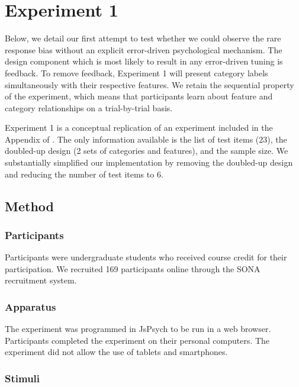 \documentclass[10pt,letterpaper]{article}
\begin{document}
\section{Experiment 1}

Below, we detail our first attempt to test whether we could observe the rare response bias without an explicit error-driven psychological mechanism.
The design component which is most likely to result in any error-driven tuning is feedback.
To remove feedback, Experiment 1 will present category labels simultaneously with their respective features.
We retain the sequential property of the experiment, which means that participants learn about feature and category relationships on a trial-by-trial basis.

Experiment 1 is a conceptual replication of an experiment included in the Appendix of .
The only information available is the list of test items (23), the doubled-up design (2 sets of categories and features), and the sample size.
We substantially simplified our implementation by removing the doubled-up design and reducing the number of test items to 6.

\subsection{Method}

\subsubsection{Participants}

Participants were undergraduate students who received course credit for their participation.
We recruited 169 participants online through the SONA recruitment system.

\subsubsection{Apparatus}

The experiment was programmed in JsPsych \cite{deleeuw2015JsPsych} to be run in a web browser.
Participants completed the experiment on their personal computers.
The experiment did not allow the use of tablets and smartphones.

\subsubsection{Stimuli}
\end{document}
